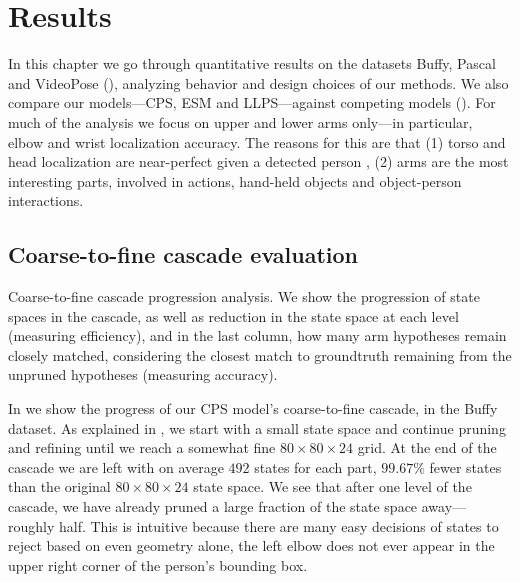 \chapter{Results}\label{sec:results}

In this chapter we go through quantitative results on the datasets Buffy, 
Pascal and VideoPose (), analyzing behavior and design choices 
of our methods.  We also compare our models---CPS, ESM and LLPS---against 
competing models ().  For much of the analysis we focus on 
upper and lower arms only---in particular, elbow and wrist localization 
accuracy.  The reasons for this are that (1) torso and head localization are 
near-perfect given a detected person \citep{deva2011}, (2) arms are the most 
interesting parts, involved in actions, hand-held objects and object-person 
interactions.


\section{Coarse-to-fine cascade evaluation}
 \begin{table}[tb]
\begin{center}

\caption[Coarse-to-fine cascade progression analysis.]{Coarse-to-fine cascade 
progression analysis. We show the progression of state spaces in the cascade, 
as well as reduction in the state space at each level (measuring efficiency), 
and in the last column, how many arm hypotheses remain closely matched, 
considering the closest match to groundtruth remaining from the unpruned 
hypotheses (measuring accuracy). }
\label{tab:c2f} 
\end{center}
\end{table}

In  we show the progress of our CPS model's coarse-to-fine cascade, 
in the Buffy dataset.
As explained in , we start with a small state space and 
continue pruning and refining until we reach a somewhat fine $80 \times 80 
\times 24$ grid.  At the end of the cascade we are left with on average $492$ 
states for each part, $99.67\%$ fewer states than the original $80 \times 80 
\times 24$ state space. We see that after one level of the cascade, we have 
already pruned a large fraction of the state space away---roughly half.  This 
is intuitive because there are many easy decisions of states to reject based on 
even geometry alone, \eg the left elbow does not ever appear in the upper right 
corner of the person's bounding box.

